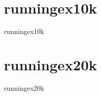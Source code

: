 \section{runningex10k}
\label{sec:datasets:runningex10k}
\begin{datasetDescription}{runningex10k}
\end{datasetDescription}

\section{runningex20k}
\label{sec:datasets:runningex20k}
\begin{datasetDescription}{runningex20k}
\end{datasetDescription}

